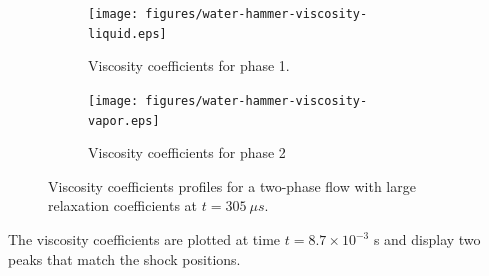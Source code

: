 \documentclass[preprint,10pt]{elsarticle}
\begin{document}
\begin{figure}[H]
        \centering
        \begin{subfigure}[b]{0.495\textwidth}
                \centering
                \texttt{[image: figures/water-hammer-viscosity-liquid.eps]}
                \caption{Viscosity coefficients for phase 1.}
                \label{fig:water-hammer-visc-liq}
        \end{subfigure}%
        \begin{subfigure}[b]{0.495\textwidth}
                \centering
                \texttt{[image: figures/water-hammer-viscosity-vapor.eps]}
                \caption{Viscosity coefficients for phase 2}
                \label{fig:water-hammer-visc-vap}
        \end{subfigure}
        
        \caption{Viscosity coefficients profiles for a two-phase flow with large relaxation coefficients at $t=305 \ \mu s$.}\label{fig:water-hammer-visc}
\end{figure}
%
The viscosity coefficients are plotted at time $t = 8.7 \times 10^{-3}$ s and display two peaks that match the shock positions.
%
\end{document}
